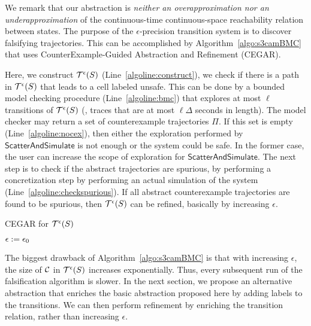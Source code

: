 We remark that our abstraction is {\em neither an overapproximation
nor an underapproximation} of the continuous-time continuous-space
reachability relation between states. The purpose of the
$\epsilon$-precision transition system is to discover falsifying
trajectories. This can be accomplished by
Algorithm~\ref{algo:s3camBMC} that uses CounterExample-Guided
Abstraction and Refinement (CEGAR).

Here, we construct $\mathcal{T}^{\epsilon}(S)$
(Line~\ref{algoline:construct}), we check if there is a path in
$\mathcal{T}^{\epsilon}(S)$ that leads to a cell labeled
unsafe. This can be done by a bounded model checking procedure
(Line~\ref{algoline:bmc}) that explores at most $\ell$ transitions of
$\mathcal{T}^{\epsilon}(S)$ (\ie, traces that are at most
$\ell\Delta$ seconds in length). The model checker may return a set of
counterexample trajectories $\Pi$. If this set is empty
(Line~\ref{algoline:nocex}), then either the exploration performed by
$\mathsf{ScatterAndSimulate}$ is not enough or the system could be
safe. In the former case, the user can increase the scope of
exploration for $\mathsf{ScatterAndSimulate}$.  The next step is to
check if the abstract trajectories are spurious, by performing a
concretization step by performing an actual simulation of the system
(Line~\ref{algoline:checkspurious}). If all abstract counterexample
trajectories are found to be spurious, then
$\mathcal{T}^{\epsilon}(S)$ can be refined, basically by
increasing $\epsilon$.
\begin{algorithm}[t] 
\DontPrintSemicolon
\caption{CEGAR for $\mathcal{T}^{\epsilon}(S)$\label{algo:s3camBMC}}
$\epsilon := \epsilon_0$ \;
\end{algorithm}

The biggest drawback of Algorithm~\ref{algo:s3camBMC} is that with
increasing $\epsilon$, the size of $\mathcal{C}$ in
$\mathcal{T}^{\epsilon}(S)$ increases exponentially.  Thus,
every subsequent run of the falsification algorithm is slower. In the
next section, we propose an alternative abstraction that enriches the
basic abstraction proposed here by adding labels to the transitions.
We can then perform refinement by enriching the transition relation,
rather than increasing $\epsilon$.

